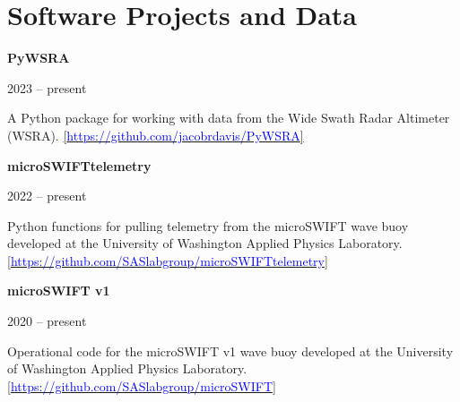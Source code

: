 \documentclass[letterpaper,11pt]{article}
\newenvironment{indentPar}[1]{
  \justifying
  \begin{list}{}{\setlength{\leftmargin}{#1}}%
  \item[]
}
{\end{list}}
\newcommand{\softwareDataEntry}[3]{
  \begin{minipage}[t]{.75\textwidth}
    \begin{flushleft}
      \textbf{#1}
    \end{flushleft}
    \end{minipage}%
    \hfill%
    \begin{minipage}[t]{.23\textwidth}
      \begin{flushright}
        #2%
      \end{flushright}%
    \end{minipage}%
    \vspace{-8pt}%
    \begin{indentPar}{0.5cm}%
      #3%
    \end{indentPar}%
    \vspace{-5pt}%
}
\newcommand{\highp}{$^\vartriangle$}
\newcommand{\medp}{$^\circ$}
\newcommand{\lowp}{$^\triangledown$}
\begin{document}


\section{Software Projects and Data}
%
\softwareDataEntry
  {PyWSRA}
  {2023 -- present}
  {A Python package for working with data from the Wide Swath Radar Altimeter (WSRA). \hfill\break
  \href{https://github.com/jacobrdavis/PyWSRA}{[\textcolor{blue}{https://github.com/jacobrdavis/PyWSRA}]}}
%
\softwareDataEntry
  {microSWIFTtelemetry}
  {2022 -- present}
  {Python functions for pulling telemetry from the microSWIFT wave buoy developed at the University of Washington Applied Physics Laboratory.
  \href{https://github.com/SASlabgroup/microSWIFTtelemetry}{[\textcolor{blue}{https://github.com/SASlabgroup/microSWIFTtelemetry}]}}
\softwareDataEntry
  {microSWIFT v1}
  {2020 -- present}
  {Operational code for the microSWIFT v1 wave buoy developed at the University of Washington Applied Physics Laboratory. \href{https://github.com/SASlabgroup/microSWIFT}{[\textcolor{blue}{https://github.com/SASlabgroup/microSWIFT}]}}
\end{document}
